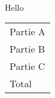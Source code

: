 \documentclass[a4paper]{article}
\begin{document}
	\ \vspace{1.5cm}
	
	Hello
	
	\vspace{15.5cm}
	{\renewcommand{\arraystretch}{3.5}\begin{tabularx}{0.5\textwidth}{|X|}
	\hline
	\LARGE Partie A \\
	\LARGE Partie B \\
	\LARGE Partie C \\
	\hline
	\LARGE Total \\
	\hline
	\end{tabularx}}
	
\end{document}
